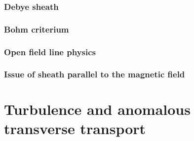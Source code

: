 			\subsubsection{Debye sheath}
			\subsubsection{Bohm criterium}
			\subsubsection{Open field line physics}
			\subsubsection{Issue of sheath parallel to the magnetic field}
	\section{Turbulence and anomalous transverse transport}
		